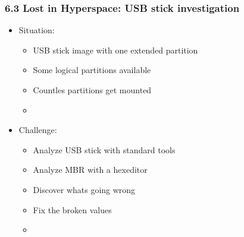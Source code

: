 \begin{frame}[fragile]
    \frametitle{6.3 Lost in Hyperspace: USB stick investigation}
  \begin{itemize}
    \item Situation:
    \begin{itemize}
      \item USB stick image with one extended partition
      \item Some logical partitions available
      \item Countles partitions get mounted
      \item[]
    \end{itemize}
    \item Challenge:
    \begin{itemize}
      \item Analyze USB stick with standard tools
      \item Analyze MBR with a hexeditor
      \item Discover whats going wrong
      \item Fix the broken values
      \item[]
    \end{itemize}
  \end{itemize}
\end{frame}


